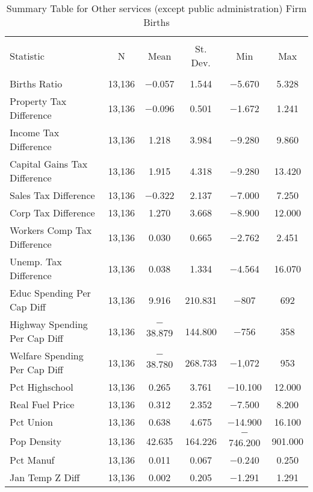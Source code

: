 
\begin{table}[!htbp] \centering 
  \caption{Summary Table for  Other services (except public administration) Firm Births} 
  \label{81summary} 
\begin{tabular}{@{\extracolsep{5pt}}lccccc} 
\\[-1.8ex]\hline 
\hline \\[-1.8ex] 
Statistic & \multicolumn{1}{c}{N} & \multicolumn{1}{c}{Mean} & \multicolumn{1}{c}{St. Dev.} & \multicolumn{1}{c}{Min} & \multicolumn{1}{c}{Max} \\ 
\hline \\[-1.8ex] 
Births Ratio & 13,136 & $-$0.057 & 1.544 & $-$5.670 & 5.328 \\ 
Property Tax Difference & 13,136 & $-$0.096 & 0.501 & $-$1.672 & 1.241 \\ 
Income Tax Difference & 13,136 & 1.218 & 3.984 & $-$9.280 & 9.860 \\ 
Capital Gains Tax Difference & 13,136 & 1.915 & 4.318 & $-$9.280 & 13.420 \\ 
Sales Tax Difference & 13,136 & $-$0.322 & 2.137 & $-$7.000 & 7.250 \\ 
Corp Tax Difference & 13,136 & 1.270 & 3.668 & $-$8.900 & 12.000 \\ 
Workers Comp Tax Difference & 13,136 & 0.030 & 0.665 & $-$2.762 & 2.451 \\ 
Unemp. Tax Difference & 13,136 & 0.038 & 1.334 & $-$4.564 & 16.070 \\ 
Educ Spending Per Cap Diff & 13,136 & 9.916 & 210.831 & $-$807 & 692 \\ 
Highway Spending Per Cap Diff & 13,136 & $-$38.879 & 144.800 & $-$756 & 358 \\ 
Welfare Spending Per Cap Diff & 13,136 & $-$38.780 & 268.733 & $-$1,072 & 953 \\ 
Pct Highschool & 13,136 & 0.265 & 3.761 & $-$10.100 & 12.000 \\ 
Real Fuel Price & 13,136 & 0.312 & 2.352 & $-$7.500 & 8.200 \\ 
Pct Union & 13,136 & 0.638 & 4.675 & $-$14.900 & 16.100 \\ 
Pop Density & 13,136 & 42.635 & 164.226 & $-$746.200 & 901.000 \\ 
Pct Manuf & 13,136 & 0.011 & 0.067 & $-$0.240 & 0.250 \\ 
Jan Temp Z Diff & 13,136 & 0.002 & 0.205 & $-$1.291 & 1.291 \\ 

\end{tabular}
\end{table}
